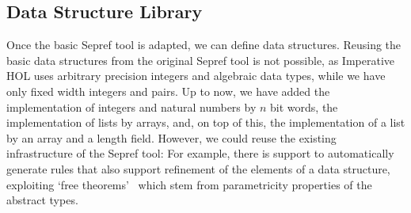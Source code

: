\documentclass[a4paper,oribibl,envcountsame]{llncs}
\begin{document}
\subsection{Data Structure Library}
Once the basic Sepref tool is adapted, we can define data structures. 
Reusing the basic data structures from the original Sepref tool is not possible, as Imperative HOL 
uses arbitrary precision integers and algebraic data types, while we have only fixed width integers and pairs.
Up to now, we have added the implementation of integers and natural numbers 
by $n$ bit words, the implementation of lists by arrays, and, on top of this, the implementation of a list 
by an array and a length field. However, we could reuse the existing infrastructure of the Sepref tool: For example,
there is support to automatically generate rules that also support refinement of the elements of a data structure, 
exploiting `free theorems'~\cite{Wad89} which stem from parametricity properties of the abstract types.
\end{document}
